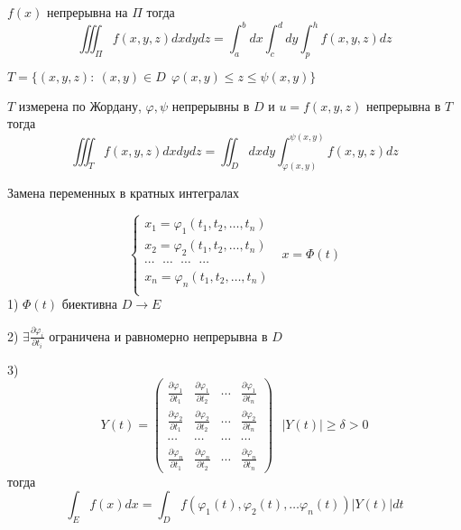 \begin{block}[Следствие]
  $f(x)$ непрерывна на $\Pi$ тогда
  $$
  \iiint_{\Pi} f(x,y,z) dxdydz = \int_a^b dx \int_c^d dy \int_p^h f(x,y,z) dz
  $$
\end{block}

\begin{theorem}
  $T = \{ (x, y, z): ~ (x, y) \in D ~~ \varphi(x, y) \le z \le \psi(x, y) \}$

  $T$ измерена по Жордану, $\varphi, \psi$ непрерывны в $D$ и
  $u = f(x, y, z)$ непрерывна в $T$ тогда
  $$
  \iiint_T f(x,y,z) dxdydz = \iint_D dx dy \int_{\varphi(x,y)}^{\psi(x,y)}
  f(x,y,z)dz
  $$
\end{theorem}

\begin{title}[\Large]
  Замена переменных в кратных интегралах
\end{title}

$$
\left\{
\begin{array}{c}
  x_1 = \varphi_1(t_1, t_2, \ldots, t_n) \\
  x_2 = \varphi_2(t_1, t_2, \ldots, t_n) \\
  \cdots ~~~ \cdots ~~~ \cdots ~~~ \cdots \\
  x_n = \varphi_n(t_1, t_2, \ldots, t_n) \\
\end{array}
\right. ~~~ x = \Phi(t)
$$
1) $\Phi(t)$ биективна $D \to E$

2) $\exists \frac{\partial \varphi_i}{\partial t_i}$ ограничена и равномерно
непрерывна в $D$

3)
$$
Y(t) =
\left(
\begin{array}{cccc}
  \frac{\partial \varphi_1}{\partial t_1} &
  \frac{\partial \varphi_1}{\partial t_2} &
  \cdots &
  \frac{\partial \varphi_1}{\partial t_n} \\

  \frac{\partial \varphi_2}{\partial t_1} &
  \frac{\partial \varphi_2}{\partial t_2} &
  \cdots &
  \frac{\partial \varphi_2}{\partial t_n} \\

  \cdots & \cdots & \cdots & \cdots \\

  \frac{\partial \varphi_n}{\partial t_1} &
  \frac{\partial \varphi_n}{\partial t_2} &
  \cdots &
  \frac{\partial \varphi_n}{\partial t_n}
\end{array}
\right) ~~~ |Y(t)| \ge \delta > 0
$$
тогда
$$
\int_E f(x) dx = \int_D f(\varphi_1(t), \varphi_2(t), \ldots \varphi_n(t))
|Y(t)|dt
$$


